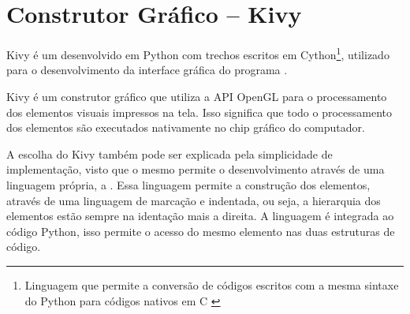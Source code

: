     
    \section{Construtor Gráfico -- Kivy}

        Kivy é um  desenvolvido em Python com trechos escritos em Cython\footnote{Linguagem que permite  a conversão de códigos escritos com a mesma sintaxe do Python para códigos nativos em C \cite{cython}}, utilizado para o desenvolvimento da interface gráfica do programa \cite{kivy}.
        
        Kivy é um construtor gráfico que utiliza a API OpenGL \cite{opengl} para o processamento dos elementos visuais impressos na tela. Isso significa que todo o processamento dos elementos são executados nativamente no chip gráfico do computador.
        
        A escolha do Kivy também pode ser explicada pela simplicidade de implementação, visto que o mesmo permite o desenvolvimento através de uma linguagem própria, a  \cite{kvlang}. Essa linguagem permite a construção dos elementos, através de uma linguagem de marcação e indentada, ou seja, a hierarquia dos elementos estão sempre na identação mais a direita. A linguagem  é integrada ao código Python, isso permite o acesso do mesmo elemento nas duas estruturas de código.
        
